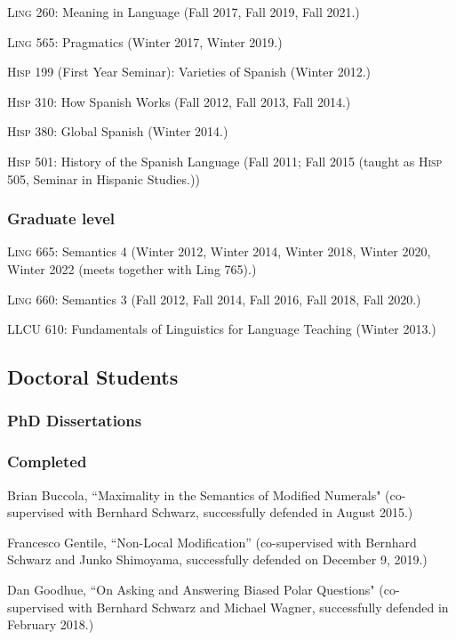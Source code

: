 \documentclass[11pt]{article}
\begin{document}
\textsc{Ling} 260: Meaning in Language (Fall 2017, Fall 2019, Fall 2021.)

\textsc{Ling} 565: Pragmatics (Winter 2017, Winter 2019.)

\textsc{Hisp} 199 (First Year Seminar): Varieties of Spanish (Winter 2012.)

\textsc{Hisp} 310: How Spanish Works (Fall 2012, Fall 2013, Fall 2014.)

\textsc{Hisp} 380: Global Spanish (Winter 2014.)

\textsc{Hisp} 501: History of the Spanish Language (Fall 2011; Fall 2015 (taught as \textsc{Hisp} 505, Seminar in Hispanic Studies.))



\subsubsection*{Graduate level}

\textsc{Ling} 665: Semantics 4 (Winter 2012, Winter 2014, Winter 2018, Winter 2020, Winter 2022 (meets together with
Ling 765).)

\textsc{Ling} 660: Semantics 3 (Fall 2012, Fall 2014, Fall 2016, Fall 2018, Fall 2020.)

LLCU 610: Fundamentals of Linguistics for Language Teaching (Winter 2013.)


\subsection*{Doctoral Students}


\subsubsection*{PhD Dissertations}


\subsubsection*{Completed}

Brian Buccola, ``Maximality in the Semantics of Modified Numerals" (co-supervised with Bernhard Schwarz, successfully defended in August 2015.)

Francesco Gentile, ``Non-Local Modification'' (co-supervised with Bernhard Schwarz and Junko Shimoyama, successfully defended on December 9, 2019.)

Dan Goodhue, ``On Asking and Answering Biased Polar Questions" (co-supervised with Bernhard Schwarz and Michael Wagner, successfully defended in February 2018.)
\end{document}
